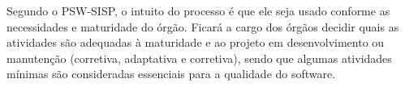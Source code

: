 Segundo o PSW-SISP, o intuito do processo é que ele seja usado conforme as 
necessidades e maturidade do órgão. Ficará a cargo dos órgãos decidir quais 
as atividades são adequadas à maturidade e ao projeto em desenvolvimento ou 
manutenção (corretiva, adaptativa e corretiva), sendo que algumas atividades 
mínimas são consideradas essenciais para a qualidade do software.
	






